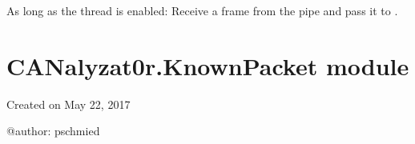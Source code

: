 \documentclass[letterpaper,10pt,english]{sphinxmanual}
\begin{document}
\begin{fulllineitems}
\begin{fulllineitems}
\begin{quote}
\begin{description}
\end{description}\end{quote}

\end{fulllineitems}


\begin{fulllineitems}
\label{\detokenize{src:src.ItemAdderThread.ItemAdderThread.run}}
As long as the thread is enabled: Receive a frame from the pipe and pass it to {\hyperref[\detokenize{src:src.ItemAdderThread.ItemAdderThread.frameToRow}]{}}.

\end{fulllineitems}


\begin{fulllineitems}
\label{\detokenize{src:src.ItemAdderThread.ItemAdderThread.staticMetaObject}}
\end{fulllineitems}


\end{fulllineitems}



\section{CANalyzat0r.KnownPacket module}
\label{\detokenize{src:canalyzat0r-knownpacket-module}}\label{\detokenize{src:module-src.KnownPacket}}
Created on May 22, 2017

@author: pschmied
\end{document}
